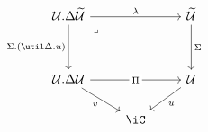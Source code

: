 \[\begin{tikzcd}
	{\Ty.\Delta\Tm} && \Tm \\
	\\
	{\Ty.\Delta\Ty} && \Ty \\
	& \iC
	\arrow["u", from=3-3, to=4-2]
	\arrow["\Sigma", from=1-3, to=3-3]
	\arrow["\Pi"{description}, from=3-1, to=3-3]
	\arrow["{\Sigma.(\util\Delta.u)}"', from=1-1, to=3-1]
	\arrow["\lambda", from=1-1, to=1-3]
	\arrow["\lrcorner"{anchor=center, pos=0.125}, draw=none, from=1-1, to=3-3]
	\arrow["v"', from=3-1, to=4-2]
\end{tikzcd}\]